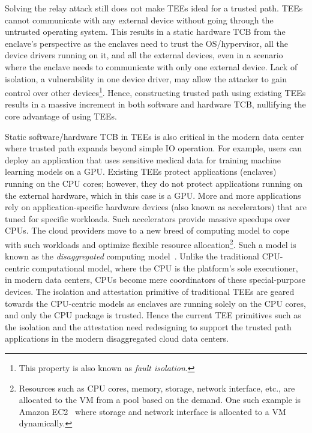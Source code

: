  Solving the relay attack still does not make TEEs ideal for a trusted path. TEEs cannot communicate with any external device without going through the untrusted operating system. This results in a static hardware TCB from the enclave's perspective as the enclaves need to trust the OS/hypervisor, all the device drivers running on it, and all the external devices, even in a scenario where the enclave needs to communicate with only one external device. Lack of isolation, a vulnerability in one device driver, may allow the attacker to gain control over other devices\footnote{This property is also known as \emph{fault isolation}.}. Hence, constructing trusted path using existing TEEs results in a massive increment in both software and hardware TCB, nullifying the core advantage of using TEEs.


 Static software/hardware TCB in TEEs is also critical in the modern data center where trusted path expands beyond simple IO operation. For example, users can deploy an application that uses sensitive medical data for training machine learning models on a GPU. Existing TEEs protect applications (enclaves) running on the CPU cores; however, they do not protect applications running on the external hardware, which in this case is a GPU. More and more applications rely on application-specific hardware devices (also known as accelerators) that are tuned for specific workloads. Such accelerators provide massive speedups over CPUs. The cloud providers move to a new breed of computing model to cope with such workloads and optimize flexible resource allocation\footnote{Resources such as CPU cores, memory, storage, network interface, etc., are allocated to the VM from a pool based on the demand. One such example is Amazon EC2~\cite{ec2} where storage and network interface is allocated to a VM dynamically.}. Such a model is known as the \emph{disaggregated} computing model~\cite{disaggregatedcomp}. Unlike the traditional CPU-centric computational model, where the CPU is the platform's sole executioner, in modern data centers, CPUs become mere coordinators of these special-purpose devices. The isolation and attestation primitive of traditional TEEs are geared towards the CPU-centric models as enclaves are running solely on the CPU cores, and only the CPU package is trusted. Hence the current TEE primitives such as the isolation and the attestation need redesigning to support the trusted path applications in the modern disaggregated cloud data centers.